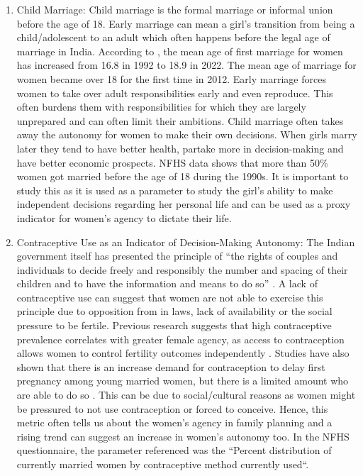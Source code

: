 \begin{sloppypar}

\begin{enumerate}
    \item Child Marriage: Child marriage is the formal marriage or informal union before the age of 18. Early marriage can mean a girl's transition from being a child/adolescent to an adult which often happens before the legal age of marriage in India. According to \cite{globaldata2012}, the mean age of first marriage for women has increased from 16.8 in 1992 to 18.9 in 2022. The mean age of marriage for women became over 18 for the first time in 2012. Early marriage forces women to take over adult responsibilities early and even reproduce. This often burdens them with responsibilities for which they are largely unprepared and can often limit their ambitions. Child marriage often takes away the autonomy for women to make their own decisions. When girls marry later they tend to have better health, partake more in decision-making and have better economic prospects. NFHS data shows that more than 50\% women got married before the age of 18 during the 1990s. It is important to study this as it is used as a parameter to study the girl's ability to make independent decisions regarding her personal life and can be used as a proxy indicator for women's agency to dictate their life.
    \item  Contraceptive Use as an Indicator of Decision-Making Autonomy: The Indian government itself has presented the principle of ``the rights of couples and individuals to decide freely and responsibly the number and spacing of their children and to have the information and means to do so”  \citep{pachauri2014priority}. A lack of contraceptive use can suggest that women are not able to exercise this principle due to opposition from in laws, lack of availability or the social pressure to be fertile. Previous research suggests that high contraceptive prevalence correlates with greater female agency, as access to contraception allows women to control fertility outcomes independently \citep{kishor2004women}.  Studies have also shown that there is an increase demand for contraception to delay first pregnancy among young married women, but there is a limited amount who are able to do so \citep{jejeebhoy2014demand}. This can be due to social/cultural reasons as women might be pressured to not use contraception or forced to conceive. Hence, this metric often tells us about the women's agency in family planning and a rising trend can suggest an increase in women's autonomy too. In the NFHS questionnaire, the parameter referenced was the ``Percent distribution of currently married women by contraceptive method currently used``.


\end{enumerate}
\end{sloppypar}

